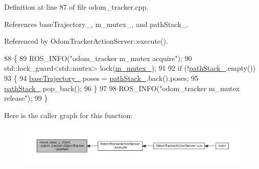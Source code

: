 Definition at line 87 of file odom\+\_\+tracker.\+cpp.



References base\+Trajectory\+\_\+, m\+\_\+mutex\+\_\+, and path\+Stack\+\_\+.



Referenced by Odom\+Tracker\+Action\+Server\+::execute().


\begin{DoxyCode}
88 \{
89     ROS\_INFO(\textcolor{stringliteral}{"odom\_tracker m\_mutex acquire"});
90     std::lock\_guard<std::mutex> lock(\hyperlink{classmove__base__z__client_1_1odom__tracker_1_1OdomTracker_a63676e03be48b18ac48d5e2f11f19a25}{m\_mutex\_});
91 
92     \textcolor{keywordflow}{if} (!\hyperlink{classmove__base__z__client_1_1odom__tracker_1_1OdomTracker_abb14ccfc0c5273714a5279baa07dfd11}{pathStack\_}.empty())
93     \{
94         \hyperlink{classmove__base__z__client_1_1odom__tracker_1_1OdomTracker_a83fa5a9bfe0b2683eee33444d3f030ea}{baseTrajectory\_}.poses = \hyperlink{classmove__base__z__client_1_1odom__tracker_1_1OdomTracker_abb14ccfc0c5273714a5279baa07dfd11}{pathStack\_}.back().poses;
95         \hyperlink{classmove__base__z__client_1_1odom__tracker_1_1OdomTracker_abb14ccfc0c5273714a5279baa07dfd11}{pathStack\_}.pop\_back();
96     \}
97 
98     ROS\_INFO(\textcolor{stringliteral}{"odom\_tracker m\_mutex release"});
99 \}
\end{DoxyCode}
Here is the caller graph for this function\+:
\nopagebreak
\begin{figure}[H]
\begin{center}
\leavevmode
\includegraphics[width=350pt]{classmove__base__z__client_1_1odom__tracker_1_1OdomTracker_ad7bc705c10a84b14df4e7d937e4e5f7e_icgraph}
\end{center}
\end{figure}
\mbox{\label{classmove__base__z__client_1_1odom__tracker_1_1OdomTracker_a79b9f1e3b15fa6ac82dd93ab78e23579}} 
